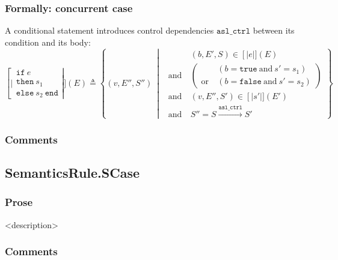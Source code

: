 \documentclass{book}
\newcommand\syntt[1]{\mathtt{#1}}
\newcommand\llbracket{[|}
\newcommand\rrbracket{|]}
\newcommand\interp[1]{\left\llbracket #1 \right\rrbracket}
\newcommand\st[0]{\ \middle|\ }
\newcommand\aslctrl[0]{\mathtt{asl\_ctrl}}
\begin{document}
  \subsubsection{Formally: concurrent case}
  A conditional statement introduces control dependencies $\aslctrl$ between its
  condition and its body:
  \begin{equation}
    \interp{\begin{array}{l}
      \syntt{if}\ e\\
      \syntt{then}\ s_1\\
      \syntt{else}\ s_2\ \syntt{end}
    \end{array}} (E) \triangleq
      \left\{ (v, E'', S'') \st{} \ 
      \begin{aligned}
        & (b, E', S) \in \interp{e} (E)
        \\ \text{and}\ &
        \left( \begin{aligned}
          & \left(b = \syntt{true}\ \text{and}\ s' = s_1 \right)
          \\ \text{or}\ &
          \left( b = \syntt{false}\ \text{and}\ s' = s_2 \right)
        \end{aligned} \right)
        \\ \text{and}\ &
        (v, E'', S') \in \interp{s'} (E')
        \\ \text{and}\ &
        S'' = S \xrightarrow{\aslctrl} S'
      \end{aligned}
      \right\}
    \label{eq:sem-ndet-scond}
  \end{equation}

  \subsubsection{Comments}

\subsection{SemanticsRule.SCase \label{sec:SemanticsRule.SCase}}

    \subsubsection{Prose}
    <description>

    \subsubsection{Comments}
\end{document}
